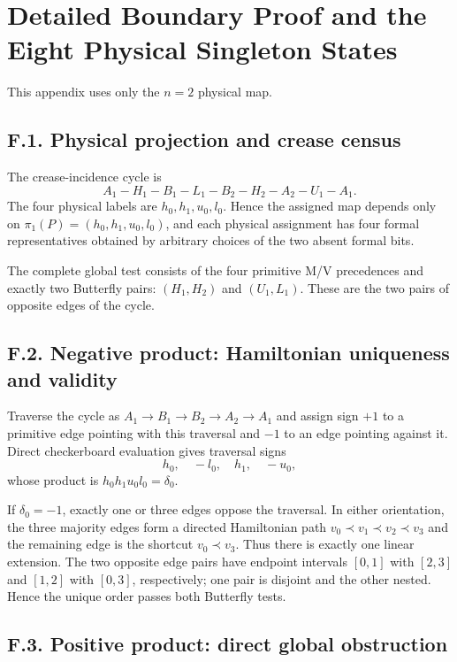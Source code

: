 \documentclass[11pt]{article}
\theoremstyle{definition}
\theoremstyle{remark}
\begin{document}
\appendix
\section{Detailed Boundary Proof and the Eight Physical Singleton States}\label{appendix-f.-detailed-boundary-proof-and-the-eight-physical-singleton-states}

This appendix uses only the \(n=2\) physical map.

\subsection{F.1. Physical projection and crease
census}\label{f.1.-physical-projection-and-crease-census}

The crease-incidence cycle is \[
A_1-H_1-B_1-L_1-B_2-H_2-A_2-U_1-A_1.
\] The four physical labels are \(h_0,h_1,u_0,l_0\). Hence the assigned
map depends only on \(\pi_1(P)=(h_0,h_1,u_0,l_0)\), and each physical
assignment has four formal representatives obtained by arbitrary choices
of the two absent formal bits.

The complete global test consists of the four primitive M/V precedences
and exactly two Butterfly pairs: \((H_1,H_2)\) and \((U_1,L_1)\). These
are the two pairs of opposite edges of the cycle.

\subsection{F.2. Negative product: Hamiltonian uniqueness and
validity}\label{f.2.-negative-product-hamiltonian-uniqueness-and-validity}

Traverse the cycle as \(A_1\to B_1\to B_2\to A_2\to A_1\) and assign
sign \(+1\) to a primitive edge pointing with this traversal and \(-1\)
to an edge pointing against it. Direct checkerboard evaluation gives
traversal signs \[
h_0,\quad -l_0,\quad h_1,\quad -u_0,
\] whose product is \(h_0h_1u_0l_0=\delta_0\).

If \(\delta_0=-1\), exactly one or three edges oppose the traversal. In
either orientation, the three majority edges form a directed Hamiltonian
path \(v_0\prec v_1\prec v_2\prec v_3\) and the remaining edge is the
shortcut \(v_0\prec v_3\). Thus there is exactly one linear extension.
The two opposite edge pairs have endpoint intervals \([0,1]\) with
\([2,3]\) and \([1,2]\) with \([0,3]\), respectively; one pair is
disjoint and the other nested. Hence the unique order passes both
Butterfly tests.

\subsection{F.3. Positive product: direct global
obstruction}\label{f.3.-positive-product-direct-global-obstruction}
\end{document}
